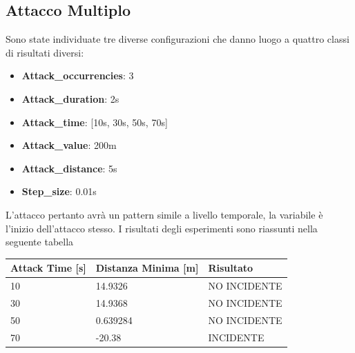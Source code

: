 \subsection{Attacco Multiplo}
Sono state individuate tre diverse configurazioni che danno luogo a quattro classi di risultati diversi:
\begin{itemize}
	\item \textbf{Attack\_occurrencies}: 3
	\item \textbf{Attack\_duration}: 2s
	\item \textbf{Attack\_time}: [10s, 30s, 50s, 70s]
	\item \textbf{Attack\_value}: 200m
	\item \textbf{Attack\_distance}: 5s
	\item \textbf{Step\_size}: 0.01s
\end{itemize}
L'attacco pertanto avrà un pattern simile a livello temporale, la variabile è l'inizio dell'attacco stesso. I risultati degli esperimenti sono riassunti nella seguente tabella
\renewcommand{\arraystretch}{1.5}
\begin{center}
	\begin{tabular}{ |p{4cm}|p{5cm}| p{4cm}|  }
		\hline
		Attack Time [s] & Distanza Minima [m] & Risultato \\
		\hline
		10 & 14.9326 & NO INCIDENTE \\
		\hline
		30 & 14.9368 & NO INCIDENTE \\
		\hline
		50 & 0.639284 & NO INCIDENTE \\
		\hline
		70 & -20.38 & INCIDENTE \\
		\hline
	\end{tabular}
\end{center}

